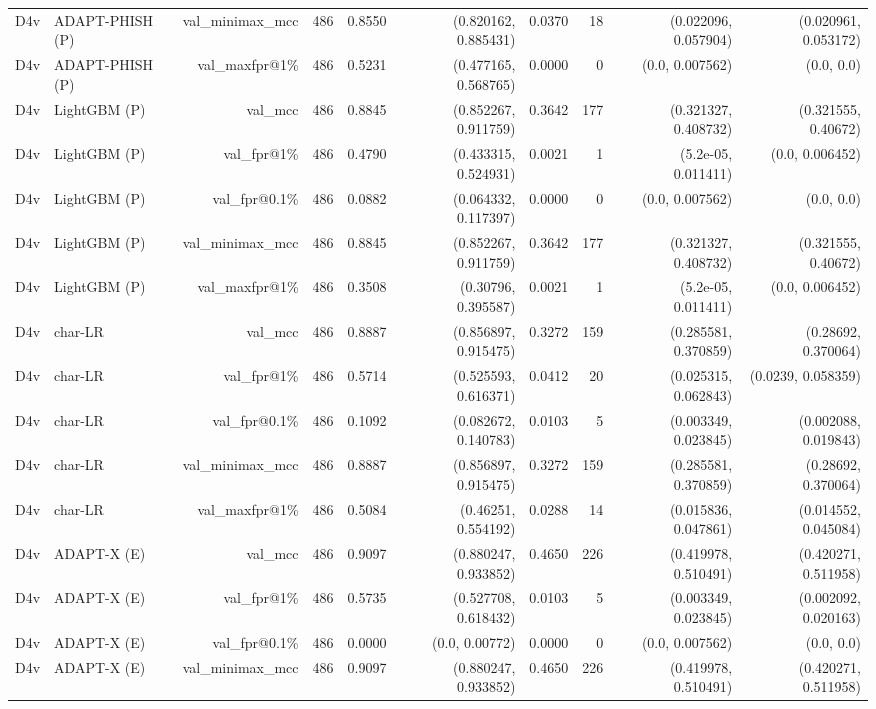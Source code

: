 \begin{table}[t]
\begin{tabular}{llrrrrrrrr}
D4v & ADAPT-PHISH (P) & val\_minimax\_mcc & 486 & 0.8550 & (0.820162, 0.885431) & 0.0370 & 18 & (0.022096, 0.057904) & (0.020961, 0.053172) \\
D4v & ADAPT-PHISH (P) & val\_maxfpr@1\% & 486 & 0.5231 & (0.477165, 0.568765) & 0.0000 & 0 & (0.0, 0.007562) & (0.0, 0.0) \\
D4v & LightGBM (P) & val\_mcc & 486 & 0.8845 & (0.852267, 0.911759) & 0.3642 & 177 & (0.321327, 0.408732) & (0.321555, 0.40672) \\
D4v & LightGBM (P) & val\_fpr@1\% & 486 & 0.4790 & (0.433315, 0.524931) & 0.0021 & 1 & (5.2e-05, 0.011411) & (0.0, 0.006452) \\
D4v & LightGBM (P) & val\_fpr@0.1\% & 486 & 0.0882 & (0.064332, 0.117397) & 0.0000 & 0 & (0.0, 0.007562) & (0.0, 0.0) \\
D4v & LightGBM (P) & val\_minimax\_mcc & 486 & 0.8845 & (0.852267, 0.911759) & 0.3642 & 177 & (0.321327, 0.408732) & (0.321555, 0.40672) \\
D4v & LightGBM (P) & val\_maxfpr@1\% & 486 & 0.3508 & (0.30796, 0.395587) & 0.0021 & 1 & (5.2e-05, 0.011411) & (0.0, 0.006452) \\
D4v & char-LR & val\_mcc & 486 & 0.8887 & (0.856897, 0.915475) & 0.3272 & 159 & (0.285581, 0.370859) & (0.28692, 0.370064) \\
D4v & char-LR & val\_fpr@1\% & 486 & 0.5714 & (0.525593, 0.616371) & 0.0412 & 20 & (0.025315, 0.062843) & (0.0239, 0.058359) \\
D4v & char-LR & val\_fpr@0.1\% & 486 & 0.1092 & (0.082672, 0.140783) & 0.0103 & 5 & (0.003349, 0.023845) & (0.002088, 0.019843) \\
D4v & char-LR & val\_minimax\_mcc & 486 & 0.8887 & (0.856897, 0.915475) & 0.3272 & 159 & (0.285581, 0.370859) & (0.28692, 0.370064) \\
D4v & char-LR & val\_maxfpr@1\% & 486 & 0.5084 & (0.46251, 0.554192) & 0.0288 & 14 & (0.015836, 0.047861) & (0.014552, 0.045084) \\
D4v & ADAPT-X (E) & val\_mcc & 486 & 0.9097 & (0.880247, 0.933852) & 0.4650 & 226 & (0.419978, 0.510491) & (0.420271, 0.511958) \\
D4v & ADAPT-X (E) & val\_fpr@1\% & 486 & 0.5735 & (0.527708, 0.618432) & 0.0103 & 5 & (0.003349, 0.023845) & (0.002092, 0.020163) \\
D4v & ADAPT-X (E) & val\_fpr@0.1\% & 486 & 0.0000 & (0.0, 0.00772) & 0.0000 & 0 & (0.0, 0.007562) & (0.0, 0.0) \\
D4v & ADAPT-X (E) & val\_minimax\_mcc & 486 & 0.9097 & (0.880247, 0.933852) & 0.4650 & 226 & (0.419978, 0.510491) & (0.420271, 0.511958) \\

\end{tabular}
\end{table}
